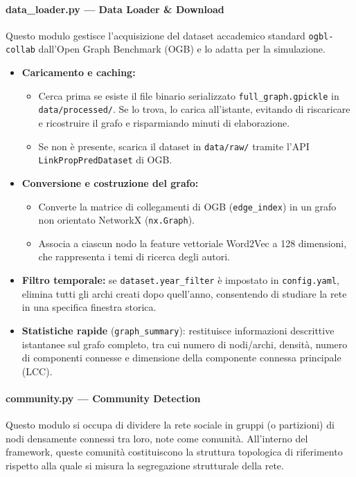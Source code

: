 \documentclass[11pt, a4paper]{article}
\begin{document}
\paragraph{data\_loader.py — Data Loader \& Download}
Questo modulo gestisce l'acquisizione del dataset accademico standard \texttt{ogbl-collab} dall'Open Graph Benchmark (OGB) e lo adatta per la simulazione.

\begin{itemize}[leftmargin=*]
    \item \textbf{Caricamento e caching:}
    \begin{itemize}
        \item Cerca prima se esiste il file binario serializzato \texttt{full\_graph.gpickle} in \texttt{data/processed/}. Se lo trova, lo carica all'istante, evitando di riscaricare e ricostruire il grafo e risparmiando minuti di elaborazione.
        \item Se non è presente, scarica il dataset in \texttt{data/raw/} tramite l'API \texttt{LinkPropPredDataset} di OGB.
    \end{itemize}
    \item \textbf{Conversione e costruzione del grafo:}
    \begin{itemize}
        \item Converte la matrice di collegamenti di OGB (\texttt{edge\_index}) in un grafo non orientato NetworkX (\texttt{nx.Graph}).
        \item Associa a ciascun nodo la feature vettoriale Word2Vec a 128 dimensioni, che rappresenta i temi di ricerca degli autori.
    \end{itemize}
    \item \textbf{Filtro temporale:} se \texttt{dataset.year\_filter} è impostato in \texttt{config.yaml}, elimina tutti gli archi creati dopo quell'anno, consentendo di studiare la rete in una specifica finestra storica.
    \item \textbf{Statistiche rapide} (\texttt{graph\_summary}): restituisce informazioni descrittive istantanee sul grafo completo, tra cui numero di nodi/archi, densità, numero di componenti connesse e dimensione della componente connessa principale (LCC).
\end{itemize}

\paragraph{community.py — Community Detection}
Questo modulo si occupa di dividere la rete sociale in gruppi (o partizioni) di nodi densamente connessi tra loro, note come comunità. All'interno del framework, queste comunità costituiscono la struttura topologica di riferimento rispetto alla quale si misura la segregazione strutturale della rete.
\end{document}
